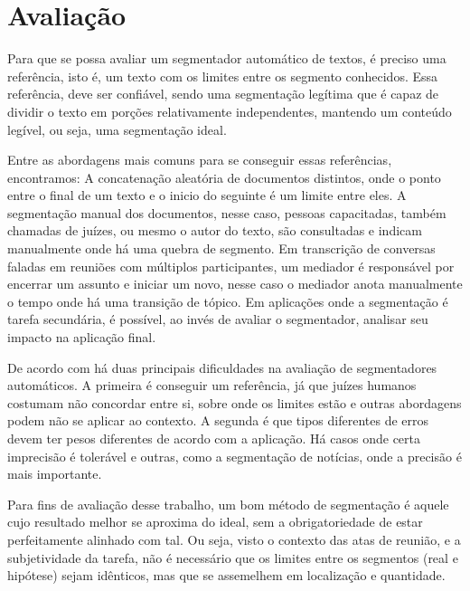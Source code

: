 
\section{Avaliação}
	\label{sec:avaliacao}



Para que se possa avaliar um segmentador automático de textos, é preciso uma referência, isto é, um texto com os limites entre os segmento conhecidos. Essa referência, deve ser confiável, sendo uma segmentação legítima que é capaz de dividir o texto em porções relativamente independentes, mantendo um conteúdo legível, ou seja, uma segmentação ideal.
%

Entre as abordagens mais comuns para se conseguir essas referências, encontramos: A concatenação aleatória de documentos distintos, onde o ponto entre o final de um texto e o inicio do seguinte é um limite entre eles. A segmentação manual dos documentos, nesse caso, pessoas capacitadas, também chamadas de juízes, ou mesmo o autor do texto, são consultadas e indicam manualmente onde há uma quebra de segmento. Em transcrição de conversas faladas em reuniões com múltiplos participantes, um mediador é responsável por encerrar um assunto e iniciar um novo, nesse caso o mediador anota manualmente o tempo onde há uma transição de tópico. Em aplicações onde a segmentação é tarefa secundária, é possível, ao invés de avaliar o segmentador, analisar seu impacto na aplicação final.


De acordo com \cite{Pevzner2002} há duas principais dificuldades na avaliação de segmentadores automáticos. A primeira é conseguir um referência, já que juízes humanos costumam não concordar entre si, sobre onde os limites estão e outras abordagens podem não se aplicar ao contexto. A segunda é que tipos diferentes de erros devem ter pesos diferentes de acordo com a aplicação. Há casos onde certa imprecisão é tolerável e outras, como a segmentação de notícias, onde a precisão é mais importante.


Para fins de avaliação desse trabalho, um bom método de segmentação é aquele cujo resultado melhor se aproxima do ideal, sem a obrigatoriedade de estar perfeitamente alinhado com tal. Ou seja, visto o contexto das atas de reunião, e a subjetividade da tarefa, não é necessário que os limites entre os segmentos (real e hipótese) sejam idênticos, mas que se assemelhem em localização e quantidade.


